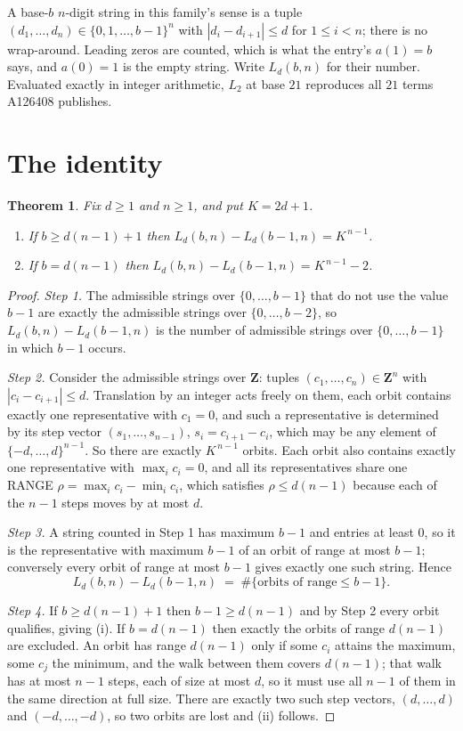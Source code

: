 \documentclass[11pt,a4paper]{article}
\theoremstyle{plain}
\newtheorem{theorem}{Theorem}
\theoremstyle{definition}
\begin{document}
A base-$b$ $n$-digit string in this family's sense is a tuple
$(d_1,\dots,d_n)\in\{0,1,\dots,b-1\}^{n}$ with $|d_i-d_{i+1}|\le d$ for $1\le i<n$; there
is no wrap-around. Leading zeros are counted, which is what the entry's $a(1)=b$ says, and
$a(0)=1$ is the empty string. Write $L_d(b,n)$ for their number. Evaluated exactly in integer
arithmetic, $L_{2}$ at base $21$ reproduces all $21$ terms A126408 publishes.

\section{The identity}

\begin{theorem}
Fix $d\ge1$ and $n\ge1$, and put $K=2d+1$.
\begin{enumerate}
\item[(i)] If $b\ge d(n-1)+1$ then $L_d(b,n)-L_d(b-1,n)=K^{\,n-1}$.
\item[(ii)] If $b=d(n-1)$ then $L_d(b,n)-L_d(b-1,n)=K^{\,n-1}-2$.
\end{enumerate}
\end{theorem}

\begin{proof}
\emph{Step 1.} The admissible strings over $\{0,\dots,b-1\}$ that do not use the value $b-1$
are exactly the admissible strings over $\{0,\dots,b-2\}$, so $L_d(b,n)-L_d(b-1,n)$ is the
number of admissible strings over $\{0,\dots,b-1\}$ in which $b-1$ occurs.

\emph{Step 2.} Consider the admissible strings over $\mathbf{Z}$: tuples
$(c_1,\dots,c_n)\in\mathbf{Z}^{n}$ with $|c_i-c_{i+1}|\le d$. Translation by an integer acts
freely on them, each orbit contains exactly one representative with $c_1=0$, and such a
representative is determined by its step vector $(s_1,\dots,s_{n-1})$, $s_i=c_{i+1}-c_i$,
which may be any element of $\{-d,\dots,d\}^{n-1}$. So there are exactly $K^{\,n-1}$ orbits.
Each orbit also contains exactly one representative with $\max_i c_i=0$, and all its
representatives share one RANGE $\rho=\max_ic_i-\min_ic_i$, which satisfies
$\rho\le d(n-1)$ because each of the $n-1$ steps moves by at most $d$.

\emph{Step 3.} A string counted in Step 1 has maximum $b-1$ and entries at least $0$, so it is
the representative with maximum $b-1$ of an orbit of range at most $b-1$; conversely every orbit
of range at most $b-1$ gives exactly one such string. Hence
\[
L_d(b,n)-L_d(b-1,n)\;=\;\#\{\text{orbits of range}\le b-1\} .
\]

\emph{Step 4.} If $b\ge d(n-1)+1$ then $b-1\ge d(n-1)$ and by Step 2 every orbit qualifies,
giving (i). If $b=d(n-1)$ then exactly the orbits of range $d(n-1)$ are excluded. An orbit has
range $d(n-1)$ only if some $c_i$ attains the maximum, some $c_j$ the minimum, and the walk
between them covers $d(n-1)$; that walk has at most $n-1$ steps, each of size at most $d$, so it
must use all $n-1$ of them in the same direction at full size. There are exactly two such step
vectors, $(d,\dots,d)$ and $(-d,\dots,-d)$, so two orbits are lost and (ii) follows.
\end{proof}
\end{document}
